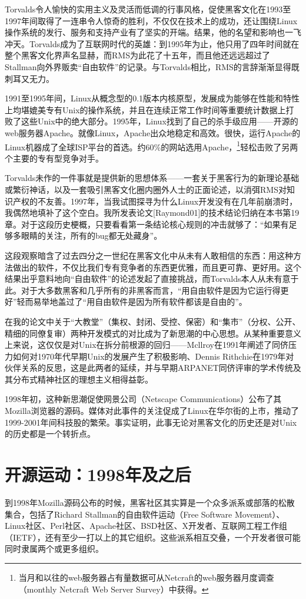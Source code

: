 \documentclass[12pt,oneside]{book}
\begin{document}
\begin{common-format}
Torvalds令人愉快的实用主义及灵活而低调的行事风格，促使黑客文化在1993至1997年间取得了一连串令人惊奇的胜利，不仅仅在技术上的成功，还让围绕Linux操作系统的发行、服务和支持产业有了坚实的开端。结果，他的名望和影响也一飞冲天。Torvalds成为了互联网时代的英雄：到1995年为止，他只用了四年时间就在整个黑客文化界声名显赫，而RMS为此花了十五年，而且他还远远超过了Stallman向外界贩卖“自由软件”的记录。与Torvalds相比，RMS的言辞渐渐显得既刺耳又无力。

1991至1995年间，Linux从概念型的0.1版本内核原型，发展成为能够在性能和特性上均堪媲美专有Unix的操作系统，并且在连续正常工作时间等重要统计数据上打败了这些Unix中的绝大部分。1995年，Linux找到了自己的杀手级应用——开源的web服务器Apache。就像Linux，Apache出众地稳定和高效。很快，运行Apache的Linux机器成了全球ISP平台的首选。约60\%{}的网站选用Apache，\footnote{当月和以往的web服务器占有量数据可从Netcraft的web服务器月度调查（monthly Netcraft Web Server Survey）中获得。}轻松击败了另两个主要的专有型竞争对手。

Torvalds未作的一件事就是提供新的思想体系——一套关于黑客行为的新理论基础或繁衍神话，以及一套吸引黑客文化圈内圈外人士的正面论述，以消弭RMS对知识产权的不友善。1997年，当我试图探寻为什么Linux开发没有在几年前崩溃时，我偶然地填补了这个空白。我所发表论文[Raymond01]的技术结论归纳在本书第19章。对于这段历史梗概，只要看看第一条结论核心规则的冲击就够了：“如果有足够多眼睛的关注，所有的bug都无处藏身”。

这段观察暗含了过去四分之一世纪在黑客文化中从未有人敢相信的东西：用这种方法做出的软件，不仅比我们专有竞争者的东西更优雅，而且更可靠、更好用。这个结果出乎意料地向“自由软件”的论述发起了直接挑战，而Torvalds本人从未有意于此。对于大多数黑客和几乎所有的非黑客而言，“用自由软件是因为它运行得更好”轻而易举地盖过了“用自由软件是因为所有软件都该是自由的”。

在我的论文中关于“大教堂”（集权、封闭、受控、保密）和“集市”（分权、公开、精细的同僚复审）两种开发模式的对比成为了新思潮的中心思想。从某种重要意义上来说，这仅仅是对Unix在拆分前根源的回归——Mcllroy在1991年阐述了同侪压力如何对1970年代早期Unix的发展产生了积极影响、Dennis Rithchie在1979年对伙伴关系的反思，这是此两者的延续，并与早期ARPANET同侪评审的学术传统及其分布式精神社区的理想主义相得益彰。

1998年初，这种新思潮促使网景公司（Netscape Communications）公布了其Mozilla浏览器的源码。媒体对此事件的关注促成了Linux在华尔街的上市，推动了1999-2001年间科技股的繁荣。事实证明，此事无论对黑客文化的历史还是对Unix的历史都是一个转折点。

\section{开源运动：1998年及之后}
到1998年Mozilla源码公布的时候，黑客社区其实算是一个众多派系或部落的松散集合，包括了Richard Stallman的自由软件运动（Free Software Movement）、Linux社区、Perl社区、Apache社区、BSD社区、X开发者、互联网工程工作组（IETF），还有至少一打以上的其它组织。这些派系相互交叠，一个开发者很可能同时隶属两个或更多组织。


\end{common-format}
\end{document}
